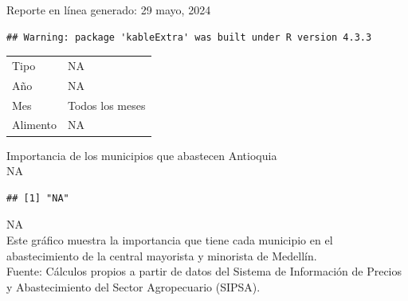 \documentclass[
]{article}
\author{}
\date{\vspace{-2.5em}}
\begin{document}
\begin{flushleft}
\large Reporte en línea generado: 29 mayo, 2024
\end{flushleft}

\begin{verbatim}
## Warning: package 'kableExtra' was built under R version 4.3.3
\end{verbatim}

\begin{longtable}[l]{>{}ll}
\toprule
 & \\
\midrule
Tipo & NA\\
Año & NA\\
Mes & Todos los meses\\
Alimento & NA\\
\bottomrule
\end{longtable}

\fontsize{20}{20}
\selectfont \textcolor{mygreen}{⁠Importancia de los municipios que abastecen Antioquia}\\
\fontsize{10}{10} \selectfont NA\\

\begin{verbatim}
## [1] "NA"
\end{verbatim}

\fontsize{10}{10} \selectfont NA\\

\fontsize{8}{8}
\selectfont \textcolor{mygreen}{Este gráfico muestra la importancia que tiene cada municipio en el abastecimiento de la central mayorista y minorista de Medellín.}\\
\fontsize{8}{8}
\selectfont \textcolor{mygreen}{Fuente: Cálculos propios a partir de datos del Sistema de Información de Precios y Abastecimiento del Sector Agropecuario (SIPSA).}\\
\end{document}
